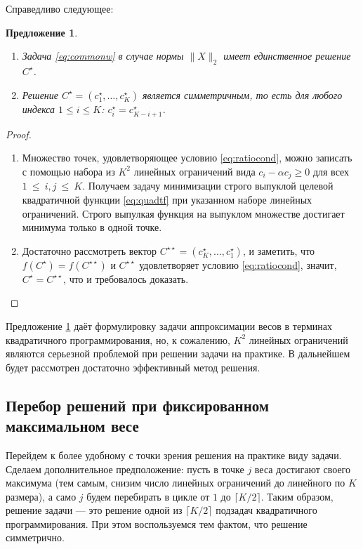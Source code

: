 \documentclass[12pt,a4paper]{article}
\newtheorem{proposition}{Предложение}
\begin{document}
Справедливо следующее:
\begin{proposition}\label{prop:uniqsymm}
\begin{enumerate}
\item Задача \ref{eq:commonw} в случае нормы $\|X\|_2$ имеет единственное решение $C^\star$.
\item Решение $C^\star = (c^\star_1, \ldots, c^\star_K)$ является симметричным, то есть для любого индекса $1 \le i \le K$: $c^\star_i = c^\star_{K - i + 1}$.
\end{enumerate}
\end{proposition}
\begin{proof}
\begin{enumerate}
\item Множество точек, удовлетворяющее условию \ref{eq:ratiocond}, можно записать с помощью набора из $K^2$ линейных ограничений вида $c_i - \alpha c_j \ge 0$ для всех $1~\le~i, j~\le~K$. Получаем задачу минимизации строго выпуклой целевой квадратичной функции \eqref{eq:quadtf} при указанном наборе линейных ограничений. Строго выпулкая функция на выпуклом множестве достигает минимума только в одной точке.
\item Достаточно рассмотреть вектор $C^{\star \star} = (c^\star_K, \ldots, c^\star_1)$, и заметить, что $f(C^\star) = f(C^{\star \star})$ и $C^{\star \star}$ удовлетворяет условию \ref{eq:ratiocond}, значит, $C^\star = C^{\star \star}$, что и требовалось доказать.
\end{enumerate}
\end{proof}
Предложение \ref{prop:uniqsymm} даёт формулировку задачи аппроксимации весов в терминах квадратичного программирования, но, к сожалению, $K^2$ линейных ограничений являются серьезной проблемой при решении задачи на практике. В дальнейшем будет рассмотрен достаточно эффективный метод решения.

\subsection{Перебор решений при фиксированном максимальном весе}
Перейдем к более удобному с точки зрения решения на практике виду задачи. Сделаем дополнительное предположение: пусть в точке $j$ веса достигают своего максимума (тем самым, снизим число линейных ограничений до линейного по $K$ размера), а само $j$ будем перебирать в цикле от $1$ до $\lceil K/2\rceil$. Таким образом, решение задачи --- это решение одной из $\lceil K/2\rceil$ подзадач квадратичного программирования. При этом воспользуемся тем фактом, что решение симметрично.
\end{document}
